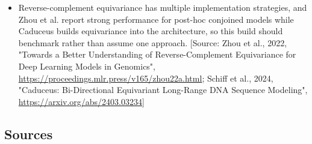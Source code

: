 \documentclass[11pt]{report}
\begin{document}
\begin{itemize}
\item Reverse-complement equivariance has multiple implementation strategies, and Zhou et al. report strong performance for post-hoc conjoined models while Caduceus builds equivariance into the architecture, so this build should benchmark rather than assume one approach. [Source: Zhou et al., 2022, "Towards a Better Understanding of Reverse-Complement Equivariance for Deep Learning Models in Genomics", \url{https://proceedings.mlr.press/v165/zhou22a.html}; Schiff et al., 2024, "Caduceus: Bi-Directional Equivariant Long-Range DNA Sequence Modeling", \url{https://arxiv.org/abs/2403.03234}]
\end{itemize}

\subsection{Sources}
\end{document}
